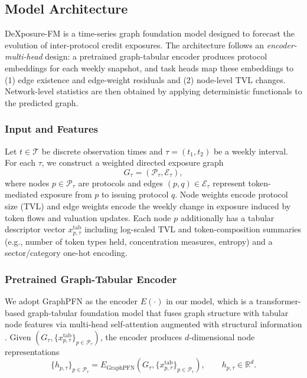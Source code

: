 \subsection{Model Architecture}\label{subsec:model-arch}

DeXposure-FM is a time-series graph foundation model designed to forecast the evolution of inter-protocol credit exposures. The architecture follows an \emph{encoder-multi-head} design: a pretrained graph-tabular encoder produces protocol embeddings for each weekly snapshot, and task heads map these embeddings to (1) edge existence and edge-weight residuals and (2) node-level TVL changes. Network-level statistics are then obtained by applying deterministic functionals to the predicted graph.

\subsubsection{Input and Features}
Let $t\in\mathcal{T}$ be discrete observation times and $\tau=(t_1,t_2)$ be a weekly interval. For each $\tau$, we construct a weighted directed exposure graph
\begin{equation}
G_\tau=(\mathcal{P}_\tau,\mathcal{E}_\tau),
\end{equation}
where nodes $p\in\mathcal{P}_\tau$ are protocols and edges $(p,q)\in\mathcal{E}_\tau$ represent token-mediated exposure from $p$ to issuing protocol $q$. Node weights encode protocol size (TVL) and edge weights encode the weekly change in exposure induced by token flows and valuation updates. Each node $p$ additionally has a tabular descriptor vector $ x^{\text{tab}}_{p,\tau}$ including log-scaled TVL and token-composition summaries (e.g., number of token types held, concentration measures, entropy) and a sector/category one-hot encoding.

\subsubsection{Pretrained Graph-Tabular Encoder}

We adopt {GraphPFN} as the encoder $E(\cdot)$ in our model, which is a transformer-based graph-tabular foundation model that fuses graph structure with tabular node features via multi-head self-attention augmented with structural information \citep{eremeev2025turningtabularfoundationmodels}. Given $(G_\tau,\{ x^{\text{tab}}_{p,\tau}\}_{p\in\mathcal{P}_\tau})$, the encoder produces
$d$-dimensional node representations
\begin{equation}
\{h_{p,\tau}\}_{p\in\mathcal{P}_\tau}
= E_{\text{GraphPFN}}\!\left(G_\tau,\{ x^{\text{tab}}_{p,\tau}\}_{p\in\mathcal{P}_\tau}\right),
\qquad h_{p,\tau}\in\mathbb{R}^d .
\end{equation}

